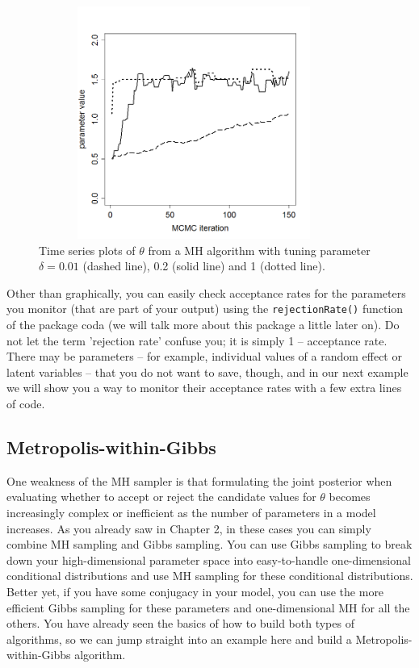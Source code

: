  \begin{figure}
\begin{center}
\includegraphics[height=3in,width=4in]{Ch7/figs/tuning}
\end{center}
\caption{Time series plots of $\theta$ from a MH algorithm with tuning parameter  $\delta = 0.01$ (dashed line), 0.2 (solid line) and  1 (dotted line).}
\label{mcmc.fig.tuning}
\end{figure}

Other than graphically, you can easily check acceptance rates for the parameters you monitor (that are part of your output) using the \verb#rejectionRate()# function of the package coda (we will talk more about this package a little later on). Do not let the term 'rejection rate' confuse you; it is simply 1 -- acceptance rate. There may be parameters -- for example, individual values of a random effect or latent variables -- that you do not want to save, though, and in our next example we will show you a way to monitor their acceptance rates with a few extra lines of code.



\subsection{ Metropolis-within-Gibbs }

One weakness of the MH sampler is that formulating the joint posterior when evaluating whether to accept or reject the candidate values for $\theta$ becomes increasingly complex or inefficient as the number of parameters in a model increases. As you already saw in Chapter 2, in these cases you can simply combine MH sampling and Gibbs sampling. You can use Gibbs sampling to break down your high-dimensional parameter space into easy-to-handle one-dimensional conditional distributions and use MH sampling for these conditional distributions. Better yet, if you have some conjugacy in your model, you can use the more efficient Gibbs sampling for these parameters and one-dimensional MH for all the others. You have already seen the basics of how to build both types of algorithms, so we can jump straight into an example here and build a Metropolis-within-Gibbs algorithm.

